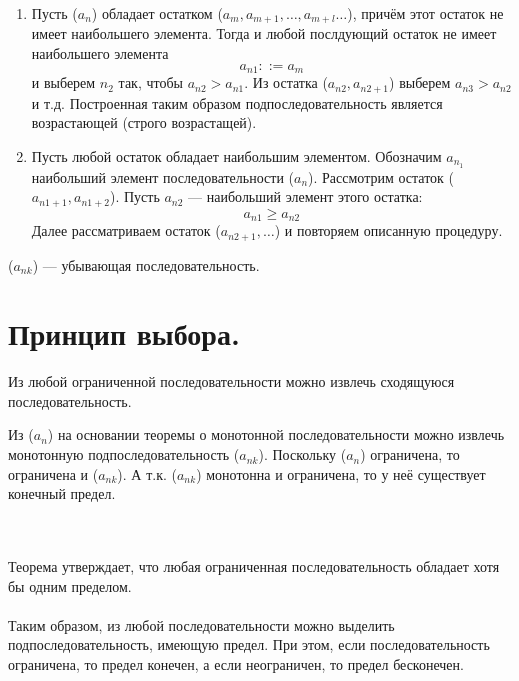 \begin{Proof}\begin{enumerate}
		\item Пусть ($a_n$) обладает остатком ($a_m , a_{m + 1} , \dots, a_{m + l} \dots $), причём этот остаток не имеет наибольшего элемента. Тогда и любой послдующий остаток не имеет наибольшего элемента
		$$a_{n1} ::= a_m$$
		и выберем $n_2$ так, чтобы $a_{n2} > a_{n1}$.
		Из остатка ($a_{n2} , a_{n2 + 1}$) выберем $a_{n3} > a_{n2}$ и т.д. Построенная таким образом подпоследовательность является возрастающей (строго возрастащей).
		\item Пусть любой остаток обладает наибольшим элементом. Обозначим $a_{n_1}$ наибольший элемент последовательности ($a_n$). Рассмотрим остаток ($a_{n1 + 1} , a_{n1 + 2}$).
		Пусть $a_{n2}$ --- наибольший элемент этого остатка:
		$$a_{n1} \geqslant a_{n2}$$
		Далее рассматриваем остаток ($a_{n2 + 1}, \dots$) и повторяем описанную процедуру.
	\end{enumerate}
	($a_{nk}$) --- убывающая последовательность.
\end{Proof}
\section{Принцип выбора.}
\begin{thbv} 
	Из любой ограниченной последовательности можно извлечь сходящуюся последовательность.
\end{thbv}
\begin{Proof}
	Из ($a_n$) на основании теоремы о монотонной последовательности можно извлечь монотонную подпоследовательность ($a_{nk}$). Поскольку ($a_n$) ограничена, то ограничена и ($a_{nk}$). А т.к. ($a_{nk}$) монотонна и ограничена, то у неё существует конечный предел.
\end{Proof}
\\\\
Теорема утверждает, что любая ограниченная последовательность обладает хотя бы одним пределом.\\\\ 
Таким образом, из любой последовательности можно выделить подпоследовательность, имеющую предел. При этом, если последовательность ограничена, то предел конечен, а если неограничен, то предел бесконечен.

